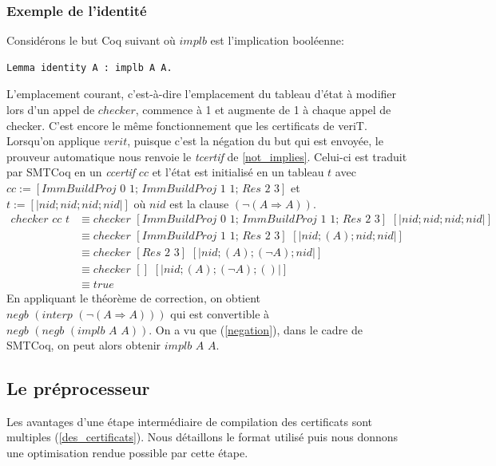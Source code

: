 \documentclass[11pt]{article}
\begin{document}
\subsubsection{Exemple de l'identité}

Considérons le but Coq suivant où $implb$ est l'implication booléenne:
\begin{lstlisting}[frame=single]
  Lemma identity A : implb A A.
\end{lstlisting}

L'emplacement courant, c'est-à-dire l'emplacement du tableau d'état à modifier lors d'un appel de $checker$, commence à 1 et augmente de 1 à chaque appel de checker. C'est encore le même fonctionnement que les certificats de veriT. \\

Lorsqu'on applique $verit$, puisque c'est la négation du but qui est envoyée, le prouveur automatique nous renvoie le \textit{tcertif} de \ref{not_implies}. Celui-ci est traduit par SMTCoq en un \textit{ccertif} $cc$ et l'état est initialisé en un tableau $t$ avec  
$cc := [ImmBuildProj \,\, 0 \,\, 1; \,ImmBuildProj \,\, 1 \,\, 1; \, Res \,\, 2 \,\, 3] $ et $t := [|nid; nid; nid; nid|]$ où $nid$ est la clause $( \neg (A \Rightarrow A))$.
\begin{align*}
    checker \,\, cc \,\, t &\equiv checker \,\, [ImmBuildProj \,\, 0 \,\, 1; \,ImmBuildProj \,\, 1 \,\, 1; \, Res \,\, 2 \,\, 3] \,\, [| nid; nid; nid; nid|] \\
    &\equiv checker \,\, [ImmBuildProj \,\, 1 \,\, 1; \, Res \,\, 2 \,\, 3] \,\, [| nid; (A); nid; nid|] \\
    &\equiv checker \,\, [Res \,\, 2 \,\, 3] \,\, [| nid; (A); (\neg A); nid|] \\
    &\equiv checker \,\, [] \,\, [| nid; (A); (\neg A); ()|] \\
    &\equiv true
\end{align*}
En appliquant le théorème de correction, on obtient $negb \,\,  (interp \,\, (\neg (A \Rightarrow A)))$ qui est convertible à $negb\,\, (negb\,\, (implb\,\, A \,\,A))$. On a vu que (\ref{negation}), dans le cadre de SMTCoq, on peut alors obtenir $implb \,\, A \,\, A$.

\subsection{Le préprocesseur}

Les avantages d'une étape intermédiaire de compilation des certificats sont multiples (\ref{des_certificats}). Nous détaillons le format utilisé puis nous donnons une optimisation rendue possible par cette étape.
\end{document}
